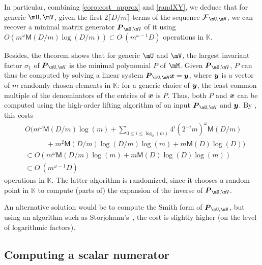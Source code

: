 \documentclass[12pt]{article}
\newcommand{\mat}[1]{\bm{\MakeUppercase{#1}}} %
\newcommand{\col}[1]{\bm{\MakeLowercase{#1}}} %
\newcommand{\seq}{\mat{\mathcal{F}}} %
\newcommand{\softO}[1]{O{\tilde{~}}(#1)} %
\newcommand{\minpoly}{P}
\def\M {\ensuremath{\mathsf{M}}}
\def\K{\mathbb{K}}
\def\K {\ensuremath{\mathbb{K}}}
\begin{document}
In particular, combining \cref{coro:cost_approx} and \cref{randXY}, we
deduce that for generic $\mU,\mV$, given the first $2 \lceil D/m
\rceil$ terms of the sequence $\seq_{\mU,\mV}$, we can recover a
minimal matrix generator  $\mat{P}_{\mU,\mV}$ of it using $O(m^\omega \M(D/m) \log(D/m))
\subset \softO{m^{\omega-1} D}$ operations in $\K$.

Besides, the theorem shows that for generic $\mU$ and $\mV$, the
largest invariant factor $\sigma_1$ of $\mat{P}_{\mU,\mV}$ is the
minimal polynomial $\minpoly$ of $\mM$.  Given $\mat{P}_{\mU,\mV}$,
$\minpoly$ can thus be computed by solving a linear system
$\mat{P}_{\mU,\mV} \col{x} = \col{y}$, where $\col{y}$ is a vector of
$m$ randomly chosen elements in $\K$: for a generic choice of
$\col{y}$, the least common multiple of the denominators of the
entries of $\col{x}$ is $\minpoly$.  Thus, both $\minpoly$ and $\col{x}$
can be computed using the
high-order lifting algorithm of \cite[Algorithm~5]{Stor03} on input
$\mat{P}_{\mU,\mV}$ and $\col{y}$. By
\cite[Corollary~16]{Stor03}, this costs
\begin{align*}
  & O\Bigg(m^{\omega} \M(D/m) \log(m) + \sum_{0 \le i \le \log_2(m)} 4^i (2^{-i}m)^\omega \M(D/m) \\
  & \quad\qquad + m^2 \M(D/m)\log(D/m)\log(m) + m \M(D) \log(D) \Bigg) \\
  & \subset O(m^\omega \M(D/m) \log(m) + m \M(D)\log(D)\log(m))  \\
  & \subset \softO{m^{\omega-1}D}
\end{align*}
operations in $\K$.
The latter algorithm is randomized, since it chooses a random point in $\K$ to
compute (parts of) the expansion of the inverse of
$\mat{P}_{\mU,\mV}$.


An alternative solution would be to compute the Smith form of
$\mat{P}_{\mU,\mV}$, but using an algorithm such as
Storjohann's~\cite[Section~17]{Stor03}, the cost is slightly higher (on the
level of logarithmic factors).


\subsection{Computing a scalar numerator}\label{ssec:scalar_numer}
\end{document}
